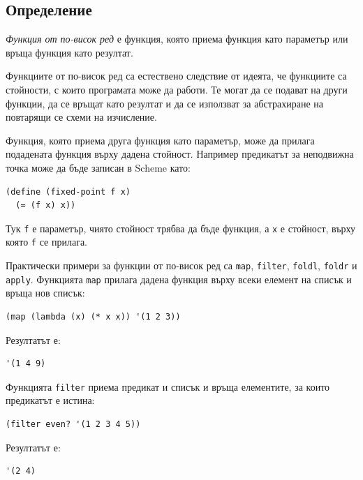 \subsection{Определение}\label{s:19.4.1}

\begin{defn}
\emph{Функция от по-висок ред} е функция, която приема функция като параметър или връща функция като резултат.
\end{defn}

Функциите от по-висок ред са естествено следствие от идеята, че функциите са стойности, с които програмата може да работи. Те могат да се подават на други функции, да се връщат като резултат и да се използват за абстрахиране на повтарящи се схеми на изчисление.

Функция, която приема друга функция като параметър, може да прилага подадената функция върху дадена стойност. Например предикатът за неподвижна точка може да бъде записан в Scheme като:

\begin{verbatim}
(define (fixed-point f x)
  (= (f x) x))
\end{verbatim}

Тук \texttt{f} е параметър, чиято стойност трябва да бъде функция, а \texttt{x} е стойност, върху която \texttt{f} се прилага.

Практически примери за функции от по-висок ред са \texttt{map}, \texttt{filter}, \texttt{foldl}, \texttt{foldr} и \texttt{apply}. Функцията \texttt{map} прилага дадена функция върху всеки елемент на списък и връща нов списък:

\begin{verbatim}
(map (lambda (x) (* x x)) '(1 2 3))
\end{verbatim}

Резултатът е:

\begin{verbatim}
'(1 4 9)
\end{verbatim}

Функцията \texttt{filter} приема предикат и списък и връща елементите, за които предикатът е истина:

\begin{verbatim}
(filter even? '(1 2 3 4 5))
\end{verbatim}

Резултатът е:

\begin{verbatim}
'(2 4)
\end{verbatim}

